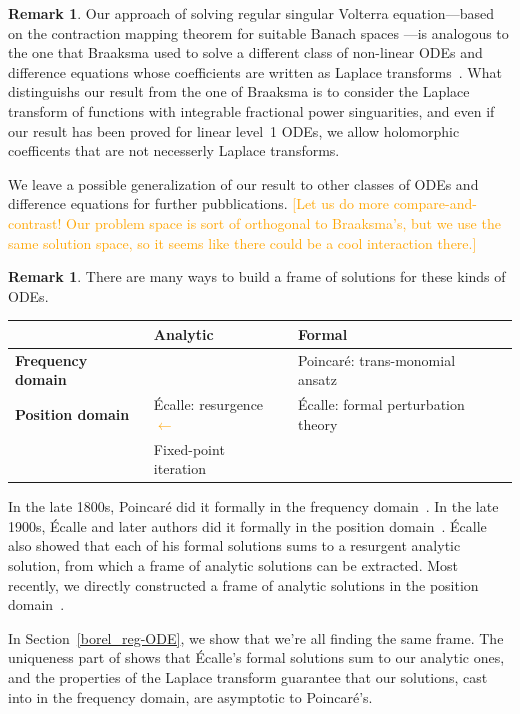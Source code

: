 \documentclass{article}
\theoremstyle{definition}
\newtheorem{remark}[definition]{Remark}
\theoremstyle{plain}
\begin{document}
\begin{remark}
Our approach of solving regular singular Volterra equation---based on the contraction mapping theorem for suitable Banach spaces \cite{reg-sing-volterra}---is analogous to the one that Braaksma used to solve a different class of non-linear ODEs and difference equations whose coefficients are written as Laplace transforms~\cite{braaksma2006laplace}. What distinguishs our result from the one of Braaksma is to consider the Laplace transform of functions with integrable fractional power singuarities, and even if our result has been proved for linear level~1 ODEs, we allow holomorphic coefficents that are not necesserly Laplace transforms. 

We leave a possible generalization of our result to other classes of ODEs and difference equations for further pubblications. \textcolor{orange}{[Let us do more compare-and-contrast! Our problem space is sort of orthogonal to Braaksma's, but we use the same solution space, so it seems like there could be a cool interaction there.]}
\end{remark}

\begin{remark}
There are many ways to build a frame of solutions for these kinds of ODEs.
\begin{center}
\begin{tabular}{l|l|l}
& \textbf{Analytic} & \textbf{Formal} \\ \hline
\textbf{Frequency domain} &  & Poincar\'{e}: trans-monomial ansatz~\cite{int-irreg} \\ \hline
\textbf{Position domain} & \'{E}calle: resurgence \textcolor{orange}{$\longleftarrow$} & \'{E}calle: formal perturbation theory~\cite{EcalleIII,loday-Remy2011} \\
& Fixed-point iteration~\cite{reg-sing-volterra} \\
\end{tabular}
\end{center}
In the late 1800s, Poincar\'{e} did it formally in the frequency domain~\cite{int-irreg}. In the late 1900s, \'{E}calle and later authors did it formally in the position domain~\cite{EcalleIII,loday-Remy2011}. \'{E}calle also showed that each of his formal solutions sums to a resurgent analytic solution, from which a frame of analytic solutions can be extracted. Most recently, we directly constructed a frame of analytic solutions in the position domain~\cite{reg-sing-volterra}.

In Section~\ref{borel_reg-ODE}, we show that we're all finding the same frame. The uniqueness part of \cite[Theorem~4]{reg-sing-volterra} shows that \'{E}calle's formal solutions sum to our analytic ones, and the properties of the Laplace transform guarantee that our solutions, cast into in the frequency domain, are asymptotic to Poincar\'{e}'s.
\end{remark} 
%
%
%
\end{document}
